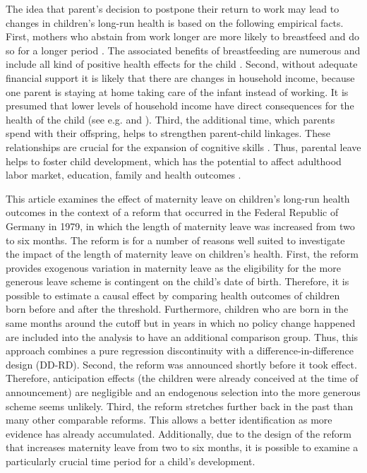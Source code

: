 \documentclass[a4paper ]{article}
\begin{document}
The idea that parent's decision to postpone their return to work may lead to changes in children's long-run health is based on the following empirical facts. First, mothers who abstain from work longer are more likely to breastfeed and do so for a longer period \citep{berger2005maternity}. The associated benefits of breastfeeding are numerous and include all kind of positive health effects for the child \citep{horta2007evidence}. Second, without adequate financial support it is likely that there are changes in household income, because one parent is staying at home taking care of the infant instead of working. It is presumed that lower levels of household income have direct consequences for the health of the child (see e.g. \cite{case2002economic} and \cite{hoynes2015income}). Third, the additional time, which parents spend with their offspring, helps to strengthen parent-child linkages. These relationships are crucial for the expansion of cognitive skills \citep{klaus1998mother}. Thus, parental leave helps to foster child development, which has the potential to affect adulthood labor market, education, family and health outcomes \citep{currie2011human}.\newline

This article examines the effect of maternity leave on children's long-run health outcomes in the context of a reform that occurred in the Federal Republic of Germany in 1979, in which the length of maternity leave was increased from two to six months. The reform is for a number of reasons well suited to investigate the impact of the length of maternity leave on children's health. First, the reform provides exogenous variation in maternity leave as the eligibility for the more generous leave scheme is contingent on the child's date of birth. Therefore, it is possible to estimate a causal effect by comparing health outcomes of children born before and after the threshold. Furthermore, children who are born in the same months around the cutoff but in years in which no policy change happened are included into the analysis to have an additional comparison group. Thus, this approach combines a pure regression discontinuity with a difference-in-difference design (DD-RD).
Second, the reform was announced shortly before it took effect. Therefore, anticipation effects (the children were already conceived at the time of announcement) are negligible and an endogenous selection into the more generous scheme seems unlikely. 
Third, the reform stretches further back in the past than many other comparable reforms. This allows a better identification as more evidence has already accumulated. Additionally, due to the design of the reform that increases maternity leave from two to six months, it is possible  to examine a particularly crucial time period for a child's development.  \newline
\end{document}
